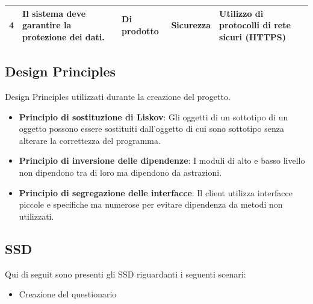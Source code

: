 \documentclass[12pt]{article}
\begin{document}
\begin{table}[H]
\begin{adjustbox}{max width=1.1\textwidth,center}
\begin{tabular}{lllll}
\multicolumn{1}{|l|}{4}                                                          & \multicolumn{1}{l|}{Il sistema deve garantire la protezione dei dati.}                   & \multicolumn{1}{l|}{Di prodotto}                                                  & \multicolumn{1}{l|}{Sicurezza}                                                      & \multicolumn{1}{l|}{Utilizzo di protocolli di rete sicuri (HTTPS)}                     \\ \hline
\end{tabular}
\endgroup
\end{adjustbox}
\end{table}


\subsection{Design Principles}
Design Principles utilizzati durante la creazione del progetto.
\begin{itemize}
	\item \textbf{Principio di sostituzione di Liskov}: Gli oggetti di un sottotipo di un oggetto possono essere sostituiti dall'oggetto di cui sono sottotipo senza alterare la correttezza del programma.
	\item \textbf{Principio di inversione delle dipendenze}: I moduli di alto e basso livello non dipendono tra di loro ma dipendono da astrazioni.
	\item \textbf{Principio di segregazione delle interfacce}: Il client utilizza interfacce piccole e specifiche ma numerose per evitare dipendenza da metodi non utilizzati.
\end{itemize}

\subsection{SSD}
Qui di seguit sono presenti gli SSD riguardanti i seguenti scenari:
\begin{itemize}
\item Creazione del questionario
\end{itemize}
\end{document}

